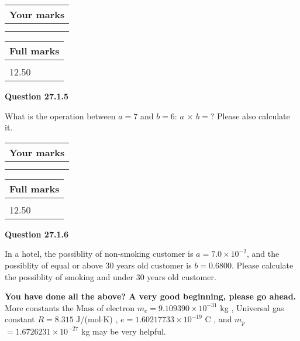 \documentclass[12pt]{article}
\begin{document}
 
\vspace{0.3in}
  
\vspace{0.2in}
  
         \begin{tabular}{|l|}
\hline
 Your marks  \\
\hline
 \\ 
 \\ 
\hline
\end{tabular}
\hspace{0.05in} \begin{tabular}{|l|}
\hline
 Full marks  \\
\hline
 \\ 
12.50 \\
\hline
\end{tabular}
{\textbf{\Large{Question
27.1.5 
}}}
  
  
What is the operation between $a= %
7$ and $b= %
6$:
$a$  %
$\times$ $b=?$ Please also calculate it.

 
\vspace{0.3in}
  
\vspace{0.2in}
  
         \begin{tabular}{|l|}
\hline
 Your marks  \\
\hline
 \\ 
 \\ 
\hline
\end{tabular}
\hspace{0.05in} \begin{tabular}{|l|}
\hline
 Full marks  \\
\hline
 \\ 
12.50 \\
\hline
\end{tabular}
{\textbf{\Large{Question
27.1.6 
}}}
  
  
In a hotel, the possiblity of  %
non-smoking customer is
$a =  %
7.0 \times 10^{-2}$, and the possiblity of  %
equal or above 30 years old customer is $ b =  %
0.6800$.
Please calculate the possiblity of  %
smoking and  %
under 30 years old customer.
 

 

 
\vspace{0.3in}
   
   
\vspace{0.3in}
{\textbf{\LARGE{You have done all the above? A very good beginning, please go ahead.}}}
More constants the
Mass of electron
$m_e$$ =
9.109390 \times 10^{-31} $
kg
,
Universal gas constant
$R$$ =
8.315 $
J/(mol$\cdot $K)
,
$e$$ =
1.60217733 \times 10^{-19} $
C
, and
$m_p$$ =
1.6726231 \times 10^{-27} $
kg
%
may be very helpful.
\vspace{0.3in}
   
\end{document}
